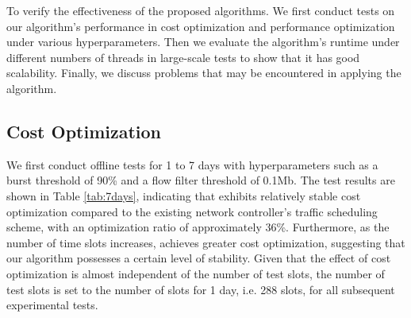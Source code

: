 To verify the effectiveness of the proposed algorithms. We first conduct tests on our algorithm's performance in cost optimization and performance optimization under various hyperparameters. Then we evaluate the algorithm's runtime under different numbers of threads in large-scale tests to show that it has good scalability. Finally, we discuss problems that may be encountered in applying the algorithm.





\subsection{Cost Optimization} \label{Cost Optimization}

We first conduct offline tests for 1 to 7 days with hyperparameters such as a burst threshold of 90\% and a flow filter threshold of 0.1Mb. The test results are shown in Table \ref{tab:7days}, indicating that {\sys} exhibits relatively stable cost optimization compared to the existing network controller's traffic scheduling scheme, with an optimization ratio of approximately 36\%. Furthermore, as the number of time slots increases, {\sys} achieves greater cost optimization, suggesting that our algorithm possesses a certain level of stability. Given that the effect of cost optimization is almost independent of the number of test slots, the number of test slots is set to the number of slots for 1 day, i.e. 288 slots, for all subsequent experimental tests.

